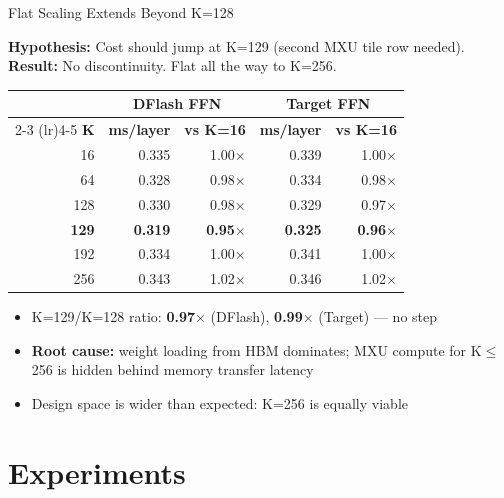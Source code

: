 \documentclass[10pt]{beamer}
\begin{document}
\begin{frame}{Flat Scaling Extends Beyond K=128}

\textbf{Hypothesis:} Cost should jump at K=129 (second MXU tile row needed).\\
\textbf{Result:} No discontinuity. Flat all the way to K=256.

\centering
\footnotesize
\vspace{0.5em}
\begin{tabular}{r rr rr}
\toprule
& \multicolumn{2}{c}{\textbf{DFlash FFN}} & \multicolumn{2}{c}{\textbf{Target FFN}} \\
\cmidrule(lr){2-3} \cmidrule(lr){4-5}
\textbf{K} & \textbf{ms/layer} & \textbf{vs K=16} & \textbf{ms/layer} & \textbf{vs K=16} \\
\midrule
16  & 0.335 & 1.00$\times$ & 0.339 & 1.00$\times$ \\
64  & 0.328 & 0.98$\times$ & 0.334 & 0.98$\times$ \\
128 & 0.330 & 0.98$\times$ & 0.329 & 0.97$\times$ \\
\rowcolor{rowyellow}
\textbf{129} & \textbf{0.319} & \textbf{0.95$\times$} & \textbf{0.325} & \textbf{0.96$\times$} \\
192 & 0.334 & 1.00$\times$ & 0.341 & 1.00$\times$ \\
256 & 0.343 & 1.02$\times$ & 0.346 & 1.02$\times$ \\
\bottomrule
\end{tabular}

\vspace{0.8em}
\begin{itemize}
  \item K=129/K=128 ratio: \textbf{0.97$\times$} (DFlash), \textbf{0.99$\times$} (Target) --- no step
  \item \textbf{Root cause:} weight loading from HBM dominates; MXU compute for K$\leq$256 is hidden behind memory transfer latency
  \item Design space is wider than expected: K=256 is equally viable
\end{itemize}
\end{frame}

\section{Experiments}
\end{document}
